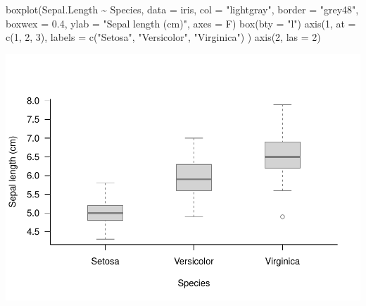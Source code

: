 \documentclass[
]{article}
\newenvironment{Shaded}{\begin{snugshade}}{\end{snugshade}}
\newcommand{\AttributeTok}[1]{\textcolor[rgb]{0.77,0.63,0.00}{#1}}
\newcommand{\DecValTok}[1]{\textcolor[rgb]{0.00,0.00,0.81}{#1}}
\newcommand{\FloatTok}[1]{\textcolor[rgb]{0.00,0.00,0.81}{#1}}
\newcommand{\FunctionTok}[1]{\textcolor[rgb]{0.00,0.00,0.00}{#1}}
\newcommand{\NormalTok}[1]{#1}
\newcommand{\SpecialCharTok}[1]{\textcolor[rgb]{0.00,0.00,0.00}{#1}}
\newcommand{\StringTok}[1]{\textcolor[rgb]{0.31,0.60,0.02}{#1}}
\begin{document}
\begin{Shaded}
\begin{Highlighting}[]
\FunctionTok{boxplot}\NormalTok{(Sepal.Length }\SpecialCharTok{\textasciitilde{}}\NormalTok{ Species, }\AttributeTok{data =}\NormalTok{ iris,}
        \AttributeTok{col =} \StringTok{"lightgray"}\NormalTok{, }\AttributeTok{border =} \StringTok{"grey48"}\NormalTok{,}
        \AttributeTok{boxwex =} \FloatTok{0.4}\NormalTok{, }\AttributeTok{ylab =} \StringTok{"Sepal length (cm)"}\NormalTok{,}
        \AttributeTok{axes =}\NormalTok{ F)}
\FunctionTok{box}\NormalTok{(}\AttributeTok{bty =} \StringTok{"l"}\NormalTok{)}
\FunctionTok{axis}\NormalTok{(}\DecValTok{1}\NormalTok{, }\AttributeTok{at =} \FunctionTok{c}\NormalTok{(}\DecValTok{1}\NormalTok{, }\DecValTok{2}\NormalTok{, }\DecValTok{3}\NormalTok{), }\AttributeTok{labels =} \FunctionTok{c}\NormalTok{(}\StringTok{"Setosa"}\NormalTok{, }\StringTok{"Versicolor"}\NormalTok{, }\StringTok{"Virginica"}\NormalTok{) )}
\FunctionTok{axis}\NormalTok{(}\DecValTok{2}\NormalTok{, }\AttributeTok{las =} \DecValTok{2}\NormalTok{)}
\end{Highlighting}
\end{Shaded}

\begin{center}\includegraphics{biostats_files/figure-latex/unnamed-chunk-134-1} \end{center}
\end{document}
